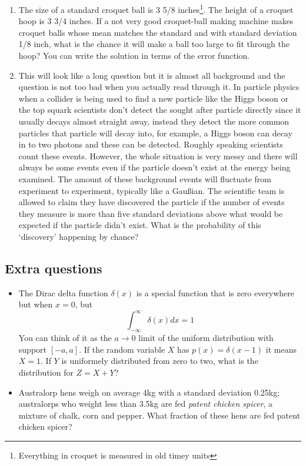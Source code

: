 \documentclass[11pt,a4paper]{scrartcl}
\begin{document}
\begin{enumerate}

\item The size of a standard croquet ball is 3 5/8
  inches\footnote{Everything in croquet is measured in old timey
    units}. The height of a croquet hoop is 3 3/4 inches. If a not
  very good croquet-ball making machine makes croquet balls whose mean
  matches the standard and with standard deviation 1/8 inch, what is
  the chance it will make a ball too large to fit through the hoop?
  You can write the solution in terms of the error function.

\item This will look like a long question but it is almost all
  background and the question is not too bad when you actually read
  through it. In particle physics when a collider is being used to
  find a new particle like the Higgs boson or the top squark
  scientists don't detect the sought after particle directly since it
  usually decays almost straight away, instead they detect the more
  common particles that particle will decay into, for example, a Higgs
  boson can decay in to two photons and these can be detected. Roughly
  speaking scientists count these events. However, the whole situation
  is very messy and there will always be some events even if the
  particle doesn't exist at the energy being examined. The amount of
  these background events will fluctuate from experiment to
  experiment, typically like a Gau\ss{}ian. The scientific team is
  allowed to claim they have discovered the particle if the number of
  events they measure is more than five standard deviations above
  what would be expected if the particle didn't exist. What is the
  probability of this \lq{}discovery\rq{} happening by chance?



\end{enumerate}

\subsection*{Extra questions}

\begin{itemize}

\item The Dirac delta function $\delta(x)$ is a special function that is zero everywhere but when $x=0$, but
$$
    \int_{-\infty}^\infty\delta(x)dx=1
$$
  You can think of it as the $a\rightarrow 0$ limit of the uniform distribution with support $[-a,a]$. If the random variable $X$ has $p(x)=\delta(x-1)$ it means $X=1$. If $Y$ is uniformely distributed from zero to two, what is the distribution for $Z=X+Y$?
  
\item Australorp hens weigh on average 4kg with a standard deviation
  0.25kg; australorps who weight less than 3.5kg are fed
  \textsl{patent chicken spicer}, a mixture of chalk, corn and
  pepper. What fraction of these hens are fed patent chicken spicer?

\end{itemize}
  
\end{document}
